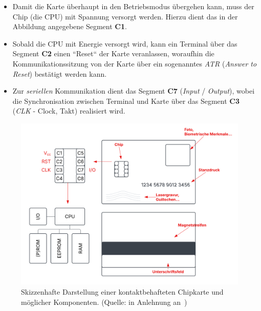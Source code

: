 \begin{itemize}
\begin{itemize}
        \item Damit die Karte überhaupt in den Betriebsmodus übergehen kann, muss der Chip (die CPU) mit Spannung versorgt werden. Hierzu dient das in der Abbildung angegebene Segment \textbf{C1}.

        \item Sobald die CPU mit Energie versorgt wird, kann ein Terminal über das Segment \textbf{C2} einen ``Reset`` der Karte veranlassen, woraufhin die Kommunikationssitzung von der Karte über ein sogenanntes \textit{ATR} (\textit{Answer to Reset}) bestätigt werden kann.

        \item Zur \textit{seriellen} Kommunikation dient das Segment \textbf{C7} (\textit{Input} / \textit{Output}), wobei die Synchronisation zwischen Terminal und Karte über das Segment \textbf{C3} (\textit{CLK} - Clock, Takt) realisiert wird.
    \end{itemize}
\end{itemize}

\begin{figure}
    \centering
    \includegraphics[scale=0.4]{aufgabe 1/img/chipkarte.svg}
    \caption{Skizzenhafte Darstellung einer kontaktbehafteten Chipkarte und möglicher Komponenten. (Quelle: in Anlehnung an~\cite[\textbf{Abb. 2.1}, 9 sowie \textbf{Abb. 2.2}, 10]{ITS5})}
    \label{fig:chipkarte}
\end{figure}
